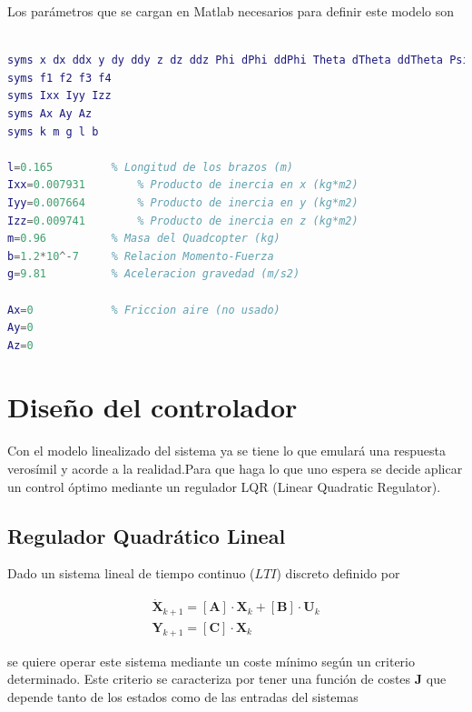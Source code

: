 \documentclass[twoside,11pt]{book}
\begin{document}
Los parámetros que se cargan en Matlab necesarios para definir este modelo son
\begin{lstlisting}[language=Matlab]
% Declaracion simbolica de las variables

syms x dx ddx y dy ddy z dz ddz Phi dPhi ddPhi Theta dTheta ddTheta Psi dPsi ddPsi
syms f1 f2 f3 f4 
syms Ixx Iyy Izz
syms Ax Ay Az 
syms k m g l b

l=0.165			% Longitud de los brazos (m)
Ixx=0.007931		% Producto de inercia en x (kg*m2)
Iyy=0.007664		% Producto de inercia en y (kg*m2)
Izz=0.009741		% Producto de inercia en z (kg*m2)
m=0.96			% Masa del Quadcopter (kg)
b=1.2*10^-7		% Relacion Momento-Fuerza
g=9.81			% Aceleracion gravedad (m/s2)

Ax=0			% Friccion aire (no usado)
Ay=0
Az=0
\end{lstlisting}


\newpage
\chapter{Diseño del controlador} \label{control}

Con el modelo linealizado del sistema ya se tiene lo que emulará una respuesta verosímil y acorde a la realidad.Para que haga lo que uno espera  se decide aplicar un control óptimo mediante un regulador LQR (Linear Quadratic Regulator). \\

\section{Regulador Quadrático Lineal}

Dado un sistema lineal de tiempo continuo ($LTI$) discreto definido por 

\begin{equation}
\begin{array}{l}
\dot{\mathbf{X}}_{k+1}=[\mathbf{A}] \cdot \mathbf{X}_{k} + [\mathbf{B}] \cdot \mathbf{U}_{k} \\
\mathbf{Y}_{k+1} = [\mathbf{C}] \cdot \mathbf{X}_{k} 
\end{array}
\end{equation} 

se quiere operar este sistema mediante un coste mínimo según un criterio determinado. Este criterio se caracteriza por tener una función de costes $\mathbf{J}$ que depende tanto de los estados como de las entradas del sistemas \cite{LQR_Wikipedia}
\end{document}
